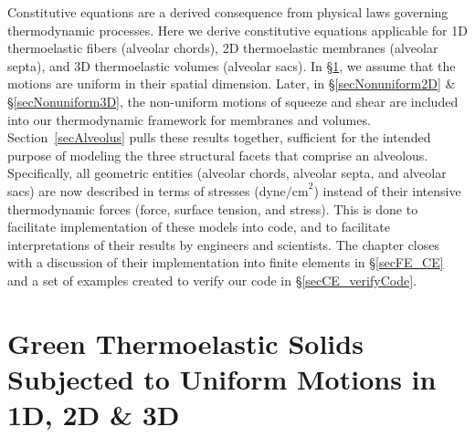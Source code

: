 Constitutive equations are a derived consequence from physical laws governing thermo\-dynamic processes.  Here we derive constitutive equations applicable for 1D thermo\-elastic fibers (alveolar chords), 2D thermo\-elastic membranes (alveolar septa), and 3D thermo\-elastic volumes (alveolar sacs).  In \S\ref{secUniformCE}, we assume that the motions are uniform in their spatial dimension.  Later, in \S\ref{secNonuniform2D} \& \S\ref{secNonuniform3D}, the non-uniform motions of squeeze and shear are included into our thermo\-dynamic framework for membranes and volumes.  Section~\ref{secAlveolus} pulls these results together, sufficient for the intended purpose of modeling the three structural facets that comprise an alveolous.  Specifically, all geometric entities (alveolar chords, alveolar septa, and alveolar sacs) are now described in terms of stresses ($\text{dyne/cm}^2$) instead of their intensive thermo\-dynamic forces (force, surface tension, and stress).  This is done to facilitate implementation of these models into code, and to facilitate interpretations of their results by engineers and scientists.  The chapter closes with a discussion of their implementation into finite elements in \S\ref{secFE_CE} and a set of examples created to verify our code in \S\ref{secCE_verifyCode}.

\section{Green Thermoelastic Solids Subjected to Uniform Motions in 1D, 2D \& 3D}
\label{secUniformCE}

